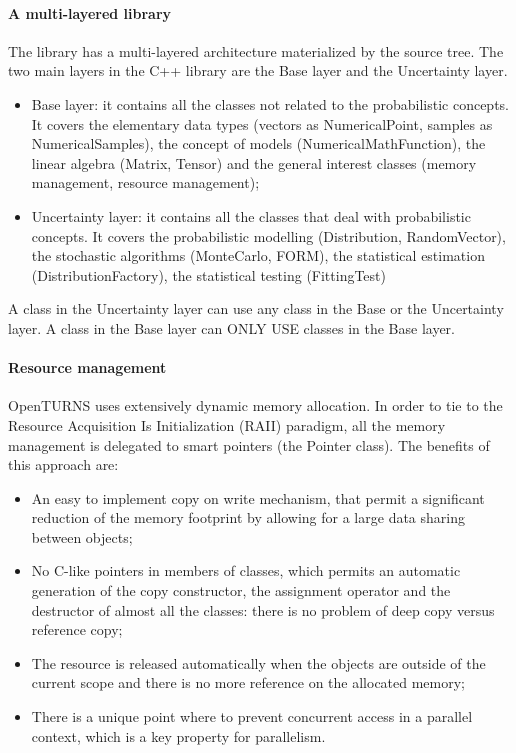 \paragraph{A multi-layered library}

The library has a multi-layered architecture materialized by the source tree.
The two main layers in the C++ library are the Base layer and the Uncertainty layer.
\begin{itemize}
\item Base layer: it contains all the classes not related to the probabilistic concepts. It covers the elementary data types (vectors as NumericalPoint, samples as NumericalSamples), the concept of models (NumericalMathFunction), the linear algebra (Matrix, Tensor) and the general interest classes (memory management, resource management);
\item Uncertainty layer: it contains all the classes that deal with probabilistic concepts. It covers the probabilistic modelling (Distribution, RandomVector), the stochastic algorithms (MonteCarlo, FORM), the statistical estimation (DistributionFactory), the statistical testing (FittingTest)
\end{itemize}
A class in the Uncertainty layer can use any class in the Base or the Uncertainty layer. A class in the Base layer can ONLY USE classes in the Base layer.

\paragraph{Resource management}

OpenTURNS uses extensively dynamic memory allocation. In order to tie to the Resource Acquisition Is Initialization (RAII) paradigm, all the memory management is delegated to smart pointers (the Pointer class). The benefits of this approach are:
\begin{itemize}
\item An easy to implement copy on write mechanism, that permit a significant reduction of the memory footprint by allowing for a large data sharing between objects;
\item No C-like pointers in members of classes, which permits an automatic generation of the copy constructor, the assignment operator and the destructor of almost all the classes: there is no problem of deep copy versus reference copy;
\item The resource is released automatically when the objects are outside of the current scope and there is no more reference on the allocated memory;
\item There is a unique point where to prevent concurrent access in a parallel context, which is a key property for parallelism.
\end{itemize}

